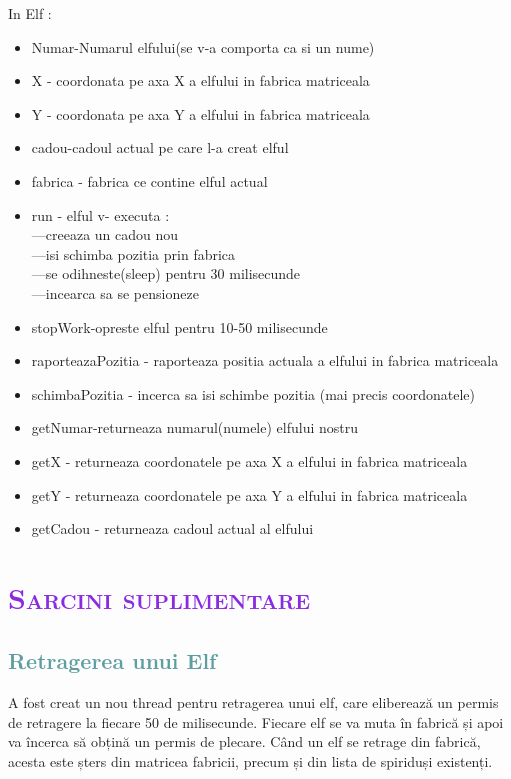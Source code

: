 \documentclass{article}
\begin{document}
In Elf :
\begin{itemize}
\item  \textcolor{Dandelion}{Numar}-Numarul elfului(se v-a comporta ca si un nume)
\item \textcolor{Dandelion}{X} - coordonata pe axa X a elfului in fabrica matriceala
\item \textcolor{Dandelion}{Y} - coordonata pe axa Y a elfului in fabrica matriceala
\item  \textcolor{Dandelion}{cadou}-cadoul actual pe care l-a creat elful
\item \textcolor{Dandelion}{fabrica} - fabrica ce contine elful actual
\item \textcolor{Dandelion}{run} - elful v- executa :\\
---creeaza un cadou nou\\
---isi schimba pozitia prin fabrica\\
---se odihneste(sleep) pentru 30 milisecunde\\
---incearca sa se pensioneze
\item  \textcolor{Dandelion}{stopWork}-opreste elful pentru 10-50 milisecunde
\item \textcolor{Dandelion}{raporteazaPozitia} - raporteaza positia actuala a elfului in fabrica matriceala
\item \textcolor{Dandelion}{schimbaPozitia} - incerca sa isi schimbe pozitia (mai precis coordonatele) 
\item  \textcolor{Dandelion}{getNumar}-returneaza numarul(numele) elfului nostru
\item \textcolor{Dandelion}{getX} - returneaza coordonatele pe axa X a elfului in fabrica matriceala
\item \textcolor{Dandelion}{getY} - returneaza coordonatele pe axa Y a elfului in fabrica matriceala
\item \textcolor{Dandelion}{getCadou} - returneaza cadoul actual al elfului
\end{itemize}

\section{\bfseries\scshape\textcolor{BlueViolet}{Sarcini suplimentare}}
\subsection{\textcolor{CadetBlue}{Retragerea unui Elf}}
A fost creat un nou thread pentru retragerea unui elf, care eliberează un permis de retragere la fiecare 50 de milisecunde. Fiecare elf se va muta în fabrică și apoi va încerca să obțină un permis de plecare. Când un elf se retrage din fabrică, acesta este șters din matricea fabricii, precum și din lista de spiriduși existenți.
\end{document}
